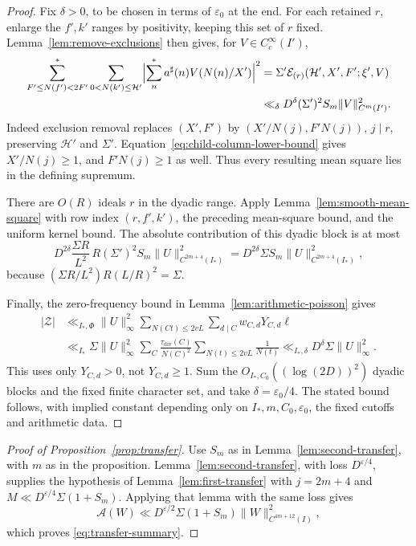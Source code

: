 \documentclass[11pt,a4paper]{article}
\numberwithin{equation}{section}
\numberwithin{figure}{section}
\theoremstyle{definition}
\theoremstyle{remark}
\newcommand{\E}{\mathcal E}
\begin{document}
\begin{proof}
Fix $\delta>0$, to be chosen in terms of $\varepsilon_0$ at the end.
For each retained $r$, enlarge the $f',k'$ ranges by positivity,
keeping this set of $r$ fixed. Lemma~\ref{lem:remove-exclusions}
then gives, for $V\in C_c^\infty(I')$,
\[
 \begin{aligned}
 \sum_{F'\le N(f')<2F'}^*\sum_{0<N(k')\le\mathcal H'}
 \Bigl|\sum_n^*a^\sharp(n)V(N(n)/X')\Bigr|^2
 &=\Sigma'\E_{(r)}(\mathcal H',X',F';\xi',V)\\
 &\ll_\delta D^\delta(\Sigma')^2S_m
                  \|V\|_{C^m(I')}^2.
 \end{aligned}
\]
Indeed exclusion removal replaces $(X',F')$ by
$(X'/N(j),F'N(j))$, $j\mid r$, preserving $\mathcal H'$ and $\Sigma'$.
Equation~\eqref{eq:child-column-lower-bound} gives $X'/N(j)\ge1$,
and $F'N(j)\ge1$ as well. Thus every resulting mean square lies in
the defining supremum.

There are $O(R)$ ideals $r$ in the dyadic range.
Apply Lemma~\ref{lem:smooth-mean-square} with row index
$(r,f',k')$, the preceding mean-square bound, and the uniform kernel bound.
The absolute contribution of this dyadic block is at most
\[
 D^{2\delta}\frac{\Sigma R}{L^2}\,
 R(\Sigma')^2S_m\|U\|_{C^{2m+4}(I_*)}^2
 =D^{2\delta}\Sigma S_m\|U\|_{C^{2m+4}(I_*)}^2,
\]
because $(\Sigma R/L^2)R(L/R)^2=\Sigma$.

Finally, the zero-frequency bound in Lemma~\ref{lem:arithmetic-poisson} gives
\[
 \begin{aligned}
 |\mathcal Z|
 &\ll_{I_*,\Phi}\|U\|_\infty^2
     \sum_{N(Ct)\le 2vL}\sum_{d\mid C}w_{C,d}Y_{C,d}\ell\\
 &\ll_{I_*}\Sigma\|U\|_\infty^2
     \sum_C\frac{\tau_{\mathrm{div}}(C)}{N(C)^2}
     \sum_{N(t)\le 2vL}\frac1{N(t)}
 \ll_{I_*,\delta}D^\delta\Sigma\|U\|_\infty^2.
 \end{aligned}
\]
This uses only $Y_{C,d}>0$, not $Y_{C,d}\ge1$.
Sum the $O_{I_*,C_0}((\log(2D))^2)$ dyadic blocks and the fixed
finite character set, and take $\delta=\varepsilon_0/4$.
The stated bound follows, with implied constant depending only on
$I_*,m,C_0,\varepsilon_0$, the fixed cutoffs and arithmetic data.
\end{proof}

\begin{proof}[Proof of Proposition~\ref{prop:transfer}]
Use $S_m$ as in Lemma~\ref{lem:second-transfer}, with $m$ as in the proposition.
Lemma~\ref{lem:second-transfer}, with loss $D^{\varepsilon/4}$,
supplies the hypothesis of Lemma~\ref{lem:first-transfer} with
$j=2m+4$ and $M\ll D^{\varepsilon/4}\Sigma(1+S_m)$.
Applying that lemma with the same loss gives
\[
 \mathcal A(W)\ll D^{\varepsilon/2}\Sigma(1+S_m)
       \|W\|_{C^{4m+12}(I)}^2,
\]
which proves \eqref{eq:transfer-summary}.
\end{proof}
\end{document}
